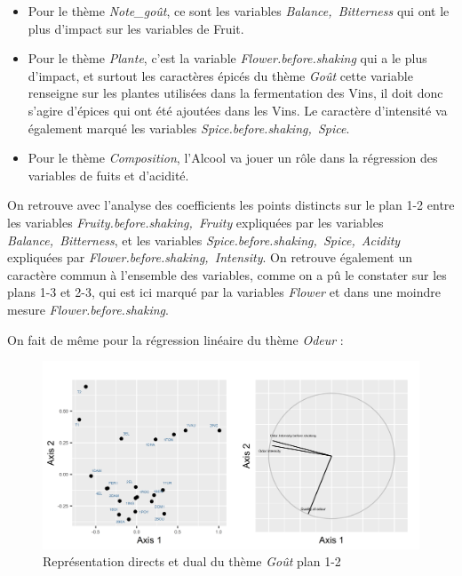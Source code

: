 \documentclass[a4paper,french,10pt]{article}
\begin{document}
\begin{itemize}
	\item Pour le thème \textit{Note\_goût}, ce sont les variables \textit{Balance,~Bitterness} qui ont le plus d'impact sur les variables de Fruit.
	\item Pour le thème \textit{Plante}, c'est la variable \textit{Flower.before.shaking} qui a le plus d'impact, et surtout les caractères épicés du thème \textit{Goût} cette variable renseigne sur les plantes utilisées dans la fermentation des Vins, il doit donc s'agire d'épices qui ont été ajoutées dans les Vins. Le caractère d'intensité va également marqué les variables \textit{Spice.before.shaking,~Spice}.
	\item Pour le thème \textit{Composition}, l'Alcool va jouer un rôle dans la régression des variables de fuits et d'acidité. 
\end{itemize}

On retrouve avec l'analyse des coefficients les points distincts sur le plan 1-2 entre les variables \textit{Fruity.before.shaking,~Fruity} expliquées par les variables \textit{Balance,~Bitterness}, et les variables \textit{Spice.before.shaking,~Spice,~Acidity} expliquées par \textit{Flower.before.shaking,~Intensity}. On retrouve également un caractère commun à l'ensemble des variables, comme on a pû le constater sur les plans 1-3 et 2-3, qui est ici marqué par la variables \textit{Flower} et dans une moindre mesure \textit{Flower.before.shaking}. \newline

On fait de même pour la régression linéaire du thème \textit{Odeur} : 

\begin{figure}[htp] 
	\centering
	\includegraphics[scale=0.45]{images/Plot.IndVar_B1_1.2.png}
	\caption{Représentation directs et dual du thème \textit{Goût} plan 1-2}
\end{figure}
\end{document}
